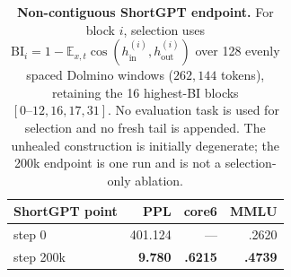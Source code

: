 \begin{table}[t]
\centering
\small
\setlength{\tabcolsep}{4pt}
\begin{tabular}{@{}lrrr@{}}
\toprule
\textbf{ShortGPT point} & \textbf{PPL} & \textbf{core6} & \textbf{MMLU} \\
\midrule
step 0 & 401.124 & --- & .2620 \\
step 200k & \textbf{9.780} & \textbf{.6215} & \textbf{.4739} \\
\bottomrule
\end{tabular}
\caption{\textbf{Non-contiguous ShortGPT endpoint.} For block $i$, selection
uses $\mathrm{BI}_i=1-\mathbb{E}_{x,t}\cos(h^{(i)}_{\mathrm{in}},
h^{(i)}_{\mathrm{out}})$ over 128 evenly spaced Dolmino windows
($262{,}144$ tokens), retaining the 16 highest-BI blocks
$[0\text{--}12,16,17,31]$. No evaluation task is used for selection and no
fresh tail is appended. The unhealed construction is initially degenerate; the
200k endpoint is one run and is not a selection-only ablation.}
\label{tab:app-shortgpt}
\end{table}
